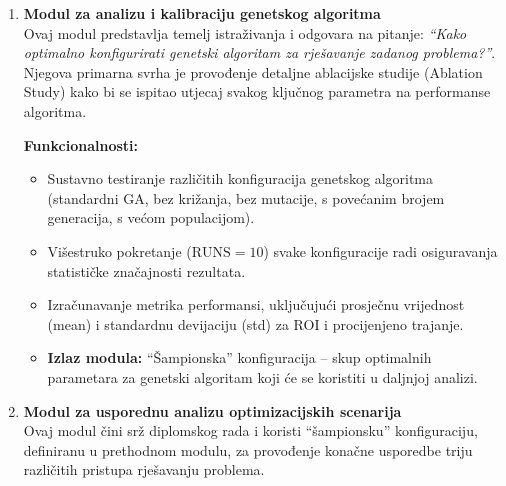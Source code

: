 \begin{enumerate}
    \item \textbf{Modul za analizu i kalibraciju genetskog algoritma} \\
    Ovaj modul predstavlja temelj istraživanja i odgovara na pitanje: \emph{``Kako optimalno konfigurirati genetski algoritam za rješavanje zadanog problema?''}. Njegova primarna svrha je provođenje detaljne ablacijske studije (Ablation Study) kako bi se ispitao utjecaj svakog ključnog parametra na performanse algoritma.
    
    \textbf{Funkcionalnosti:}
    \begin{itemize}
        \item Sustavno testiranje različitih konfiguracija genetskog algoritma (standardni GA, bez križanja, bez mutacije, s povećanim brojem generacija, s većom populacijom).
        \item Višestruko pokretanje (\( \text{RUNS} = 10 \)) svake konfiguracije radi osiguravanja statističke značajnosti rezultata.
        \item Izračunavanje metrika performansi, uključujući prosječnu vrijednost (mean) i standardnu devijaciju (std) za ROI i procijenjeno trajanje.
        \item \textbf{Izlaz modula:} ``Šampionska'' konfiguracija – skup optimalnih parametara za genetski algoritam koji će se koristiti u daljnjoj analizi.
    \end{itemize}

    \item \textbf{Modul za usporednu analizu optimizacijskih scenarija} \\
    Ovaj modul čini srž diplomskog rada i koristi ``šampionsku'' konfiguraciju, definiranu u prethodnom modulu, za provođenje konačne usporedbe triju različitih pristupa rješavanju problema.
    

\end{enumerate}
